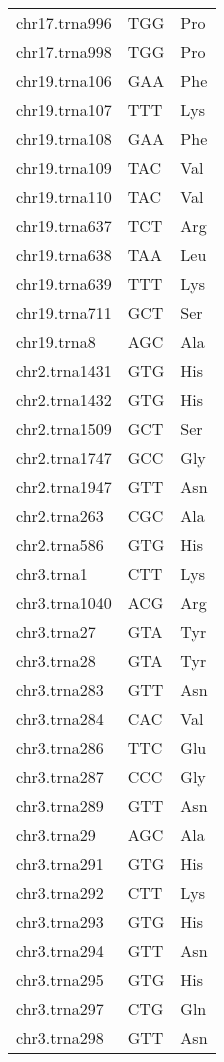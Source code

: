 \begin{longtable}{@{}l>{\collectcell\anticodon}l<{\endcollectcell}l@{}}
    chr17.trna996 & TGG & Pro \\
    chr17.trna998 & TGG & Pro \\
    chr19.trna106 & GAA & Phe \\
    chr19.trna107 & TTT & Lys \\
    chr19.trna108 & GAA & Phe \\
    chr19.trna109 & TAC & Val \\
    chr19.trna110 & TAC & Val \\
    chr19.trna637 & TCT & Arg \\
    chr19.trna638 & TAA & Leu \\
    chr19.trna639 & TTT & Lys \\
    chr19.trna711 & GCT & Ser \\
    chr19.trna8 & AGC & Ala \\
    chr2.trna1431 & GTG & His \\
    chr2.trna1432 & GTG & His \\
    chr2.trna1509 & GCT & Ser \\
    chr2.trna1747 & GCC & Gly \\
    chr2.trna1947 & GTT & Asn \\
    chr2.trna263 & CGC & Ala \\
    chr2.trna586 & GTG & His \\
    chr3.trna1 & CTT & Lys \\
    chr3.trna1040 & ACG & Arg \\
    chr3.trna27 & GTA & Tyr \\
    chr3.trna28 & GTA & Tyr \\
    chr3.trna283 & GTT & Asn \\
    chr3.trna284 & CAC & Val \\
    chr3.trna286 & TTC & Glu \\
    chr3.trna287 & CCC & Gly \\
    chr3.trna289 & GTT & Asn \\
    chr3.trna29 & AGC & Ala \\
    chr3.trna291 & GTG & His \\
    chr3.trna292 & CTT & Lys \\
    chr3.trna293 & GTG & His \\
    chr3.trna294 & GTT & Asn \\
    chr3.trna295 & GTG & His \\
    chr3.trna297 & CTG & Gln \\
    chr3.trna298 & GTT & Asn \\

\end{longtable}
